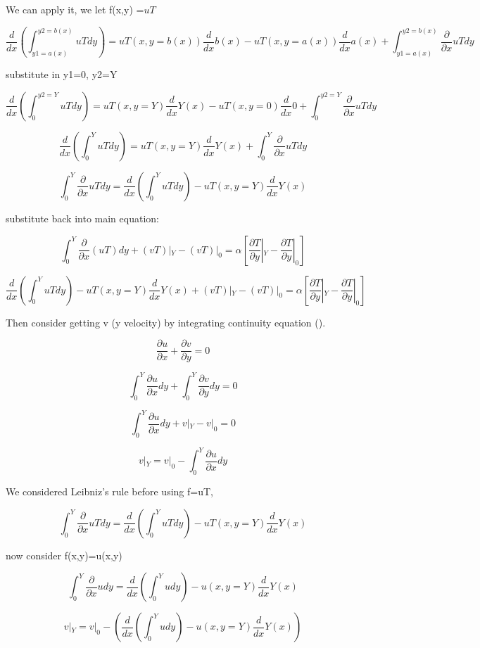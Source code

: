 \documentclass[11pt]{article}
\begin{document}
We can apply it, we let f(x,y) =$uT$

$$\frac{d}{dx} \left( \int_{y1=a(x)}^{y2=b(x)} uT dy \right)= uT(x,y=b(x)) \frac{d}{dx}b(x) - uT(x,y=a(x)) \frac{d}{dx} a(x)  +  \int_{y1=a(x)}^{y2=b(x)} \frac{\partial}{\partial x} uT dy $$

substitute in y1=0, y2=Y

$$\frac{d}{dx} \left( \int_{0}^{y2=Y} uT dy \right)= uT(x,y=Y) \frac{d}{dx}Y(x) - uT(x,y=0) \frac{d}{dx} 0  +  \int_{0}^{y2=Y} \frac{\partial}{\partial x} uT dy $$


$$\frac{d}{dx} \left( \int_{0}^{Y} uT dy \right)= uT(x,y=Y) \frac{d}{dx}Y(x) +  \int_{0}^{Y} \frac{\partial}{\partial x} uT dy $$

$$ \int_{0}^{Y} \frac{\partial}{\partial x} uT dy = \frac{d}{dx} \left( \int_{0}^{Y} uT dy \right) - uT(x,y=Y) \frac{d}{dx}Y(x)$$

substitute back into main equation:

$$ \int_0^Y \frac{\partial}{\partial x}(uT)  dy  + (vT)|_Y - (vT)|_0 = \alpha [\frac{\partial T}{\partial y}|_Y -  \frac{\partial T}{\partial y} |_0] $$ 

$$ \frac{d}{dx} \left( \int_{0}^{Y} uT dy \right) - uT(x,y=Y) \frac{d}{dx}Y(x)  + (vT)|_Y - (vT)|_0 = \alpha [\frac{\partial T}{\partial y}|_Y -  \frac{\partial T}{\partial y} |_0] $$ 


Then consider getting v (y velocity) by integrating continuity equation (\cite{bejan2013convection}).

$$\frac{\partial u}{\partial x} + \frac{\partial v}{\partial y} = 0$$

$$ \int_0^Y \frac{\partial u}{\partial x} dy + \int_0^Y \frac{\partial v}{\partial y} dy = 0$$

$$ \int_0^Y \frac{\partial u}{\partial x} dy + v|_Y - v|_0 = 0$$

$$v|_Y = v|_0 - \int_0^Y \frac{\partial u}{\partial x} dy $$

We considered Leibniz's rule before using f=uT,

$$ \int_{0}^{Y} \frac{\partial}{\partial x} uT dy = \frac{d}{dx} \left( \int_{0}^{Y} uT dy \right) - uT(x,y=Y) \frac{d}{dx}Y(x)$$

now consider f(x,y)=u(x,y)

$$ \int_{0}^{Y} \frac{\partial}{\partial x} u dy = \frac{d}{dx} \left( \int_{0}^{Y} u dy \right) - u(x,y=Y) \frac{d}{dx}Y(x)$$

$$v|_Y = v|_0 - (\frac{d}{dx} \left( \int_{0}^{Y} u dy \right) - u(x,y=Y) \frac{d}{dx}Y(x))$$
\end{document}
